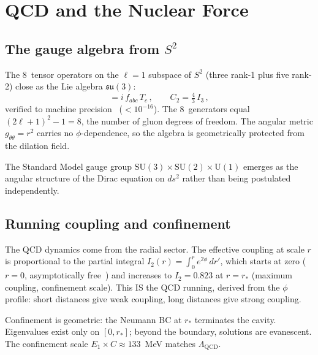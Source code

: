 \documentclass[aps,prd,twocolumn,superscriptaddress,nofootinbib,longbibliography]{revtex4-2}
\newcommand{\rstar}{r_{*}}
\begin{document}
\section{QCD and the Nuclear Force}\label{sec:nuclear}

\subsection{The gauge algebra from $S^2$}

The 8~tensor operators on the $\ell = 1$ subspace of $S^2$ (three
rank-1 plus five rank-2) close as the Lie algebra
$\mathfrak{su}(3)$:
\begin{equation}
  [T_a, T_b] = i\,f_{abc}\,T_c\,,
  \qquad C_2 = \tfrac{4}{3}\,I_3\,,
\end{equation}
verified to machine precision~\cite{GellMann1964} ($< 10^{-16}$).  The 8~generators
equal $(2\ell+1)^2 - 1 = 8$, the number of gluon degrees of
freedom.  The angular metric $g_{\theta\theta} = r^2$ carries no
$\phi$-dependence, so the algebra is geometrically protected from the
dilation field.

The Standard Model gauge group $\mathrm{SU}(3) \times
\mathrm{SU}(2) \times \mathrm{U}(1)$ emerges as the angular
structure of the Dirac equation on $ds^2$ rather than being
postulated independently.

\subsection{Running coupling and confinement}

The QCD dynamics come from the radial sector.  The effective
coupling at scale $r$ is proportional to the partial integral
$I_2(r) = \int_0^r e^{2\phi}\,dr'$, which starts at zero
($r = 0$, asymptotically free~\cite{Gross1973,Politzer1973}) and increases to $I_2 = 0.823$
at $r = \rstar$ (maximum coupling, confinement scale).  This IS
the QCD running, derived from the $\phi$ profile: short distances
give weak coupling, long distances give strong coupling.

Confinement is geometric: the Neumann BC at $\rstar$ terminates
the cavity.  Eigenvalues exist only on $[0, \rstar]$;
beyond the boundary, solutions are evanescent.  The confinement
scale $E_1 \times C \approx 133$~MeV matches
$\Lambda_\mathrm{QCD}$.
\end{document}
